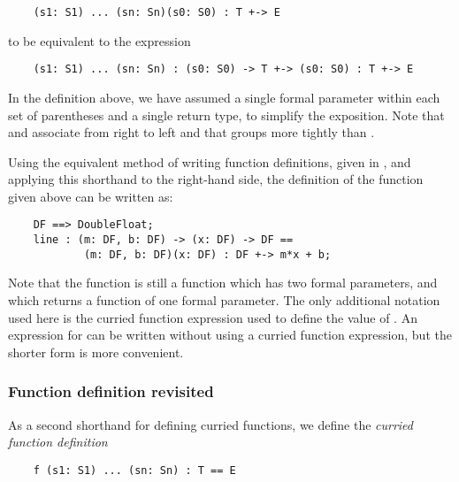 \begin{small}
\begin{verbatim}
    (s1: S1) ... (sn: Sn)(s0: S0) : T +-> E
\end{verbatim}
\end{small}

to be equivalent to the expression

\begin{small}
\begin{verbatim}
    (s1: S1) ... (sn: Sn) : (s0: S0) -> T +-> (s0: S0) : T +-> E
\end{verbatim}
\end{small}

In the definition above, we have assumed a single formal parameter within
each set of parentheses and a single return type, to simplify the exposition.
Note that \ttin{->} and \ttin{+->} associate from right to left
and that \ttin{->} groups more tightly than \ttin{+->}.

Using the equivalent method of writing function definitions, given in
, and applying this shorthand to the
right-hand side, the definition of the function  given above
can be written as:

\begin{small}
\begin{verbatim}
    DF ==> DoubleFloat;
    line : (m: DF, b: DF) -> (x: DF) -> DF ==
            (m: DF, b: DF)(x: DF) : DF +-> m*x + b;
\end{verbatim}
\end{small}

Note that the function  is still a function which has
two formal parameters, and which returns a function of one formal parameter.
The only additional notation used here is the curried function expression
used to define the value of .  An expression for  can
be written without using a curried function expression, but the shorter form
is more convenient.

\subsubsection{Function definition revisited}

As a second shorthand for defining curried functions, we define
the {\em curried function definition\/}

\begin{small}
\begin{verbatim}
    f (s1: S1) ... (sn: Sn) : T == E
\end{verbatim}
\end{small}

